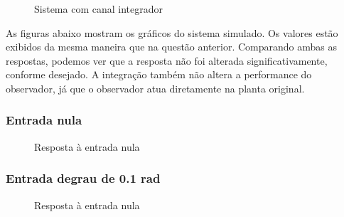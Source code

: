 \documentclass[13pt]{article}
\begin{document}
    \begin{figure}[H]
\centering

\caption{Sistema com canal integrador}
\end{figure}

As figuras abaixo mostram os gráficos do sistema simulado. Os valores estão exibidos da mesma maneira que na questão anterior. Comparando ambas as respostas, podemos ver que a resposta não foi alterada significativamente, conforme desejado. A integração também não altera a performance do observador, já que o observador atua diretamente na planta original.

    \hypertarget{entrada-nula}{%
\subsubsection{Entrada nula}\label{entrada-nula}}

    \begin{figure}[H]
\centering

\caption{Resposta à entrada nula}
\end{figure}

    \hypertarget{entrada-degrau-de-0.1-rad}{%
\subsubsection{Entrada degrau de 0.1
rad}\label{entrada-degrau-de-0.1-rad}}

\begin{figure}[H]
\centering

\caption{Resposta à entrada nula}
\end{figure}
    
    
    
\end{document}
